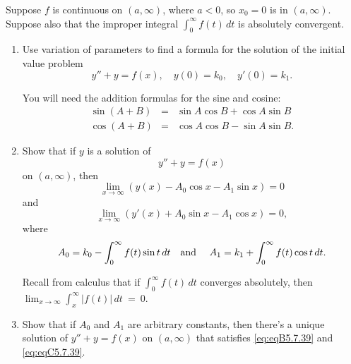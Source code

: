\documentclass{ximera}
\begin{document}
\begin{problem}\label{exer:5.7.39}
Suppose $f$ is continuous on
$(a,\infty)$, where $a<0$, so $x_0=0$ is in $(a,\infty)$.  Suppose also that the improper
integral
$\int_{0}^\infty f(t)\,dt$ is absolutely convergent.

\begin{enumerate}
\item %
Use variation of parameters to
find a formula for the solution of the initial value problem
$$
y''+y=f(x), \quad  y(0)=k_0,\quad y'(0)=k_1.
$$
\begin{hint}
    You will need the addition formulas for the sine and cosine:
\begin{eqnarray*}
\sin(A+B)&=&\sin A\cos B+\cos A\sin B\\
\cos(A+B)&=&\cos A\cos B-\sin A\sin B.
\end{eqnarray*}
\end{hint}

\item %
Show that if $y$ is a solution of
\begin{equation}\label{eq:eqA5.7.39}
y''+y=f(x)
\end{equation}
 on $(a,\infty)$, then
\begin{equation}\label{eq:eqB5.7.39}
\lim_{x \to \infty}\left(y(x)-A_0\cos x-A_1\sin x\right)=0
\end{equation}
and
\begin{equation}\label{eq:eqC5.7.39}
\lim_{x\to\infty}\left(y'(x)+A_0\sin x-A_1\cos x\right)=0,
\end{equation}
where
$$
A_0=k_0-\int_0^\infty f(t)\sin t\,dt\mbox{\quad and \quad}
A_1=k_1+\int_0^\infty f(t)\cos t\,dt.
$$
\begin{hint}
   Recall from calculus that if $\int_0^\infty f(t)\,dt$
converges absolutely, then $\lim_{x\to\infty}\int_x^\infty
|f(t)|\,dt~=~0$. 
\end{hint}

\item %
Show that if $A_0$ and $A_1$ are arbitrary constants, then there's a
unique solution of $y''+y=f(x)$ on $(a,\infty)$ that satisfies
\ref{eq:eqB5.7.39}  and \ref{eq:eqC5.7.39}.
\end{enumerate}
\end{problem}
\end{document}

